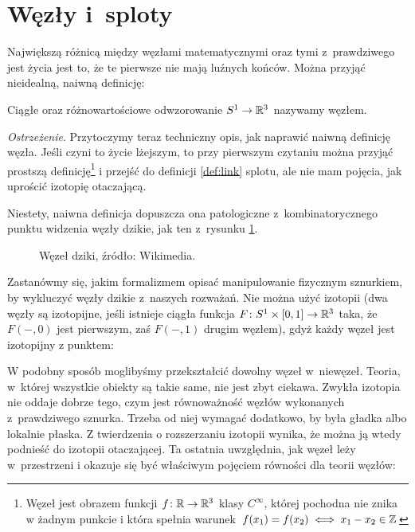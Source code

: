 
\section{Węzły i~sploty}
Największą różnicą między węzłami matematycznymi oraz tymi z~prawdziwego jest życia jest to, że te pierwsze nie mają luźnych końców.
Można przyjąć nieidealną, naiwną definicję:

\begin{definition}
    Ciągłe oraz różnowartościowe odwzorowanie $S^1 \to \mathbb R^3$ nazywamy węzłem.
\end{definition}

\emph{Ostrzeżenie}.
Przytoczymy teraz techniczny opis, jak naprawić naiwną definicję węzła. 
Jeśli czyni to życie lżejszym, to przy pierwszym czytaniu można przyjąć prostszą definicję\footnote{Węzeł jest obrazem funkcji $f \colon \mathbb R \to \mathbb R^3$ klasy $C^\infty$, której pochodna nie znika w żadnym punkcie i która spełnia warunek $f(x_1) = f(x_2) \iff x_1 - x_2 \in \mathbb Z$} i przejść do definicji \ref{def:link} splotu, ale nie mam pojęcia, jak uprościć izotopię otaczającą.

Niestety, naiwna definicja dopuszcza ona patologiczne z~kombinatorycznego punktu widzenia węzły dzikie, jak ten z~rysunku \ref{fig_wild_knot}.

\begin{figure}[H]
    \centering

    \caption[caption-for-lof-1]{Węzeł dziki, źródło: Wikimedia{\footnotemark}.}
    \label{fig_wild_knot}
\end{figure}

Zastanówmy się, jakim formalizmem opisać manipulowanie fizycznym sznurkiem, by wykluczyć węzły dzikie z~naszych rozważań.
Nie można użyć izotopii (dwa węzły są izotopijne, jeśli istnieje ciągła funkcja $F \colon S^1 \times [0, 1] \to \mathbb R^3$ taka, że $F(-, 0)$ jest pierwszym, zaś $F(-,1)$ drugim węzłem), gdyż każdy węzeł jest izotopijny z punktem:


W podobny sposób moglibyśmy przekształcić dowolny węzeł w~niewęzeł.
Teoria, w~której wszystkie obiekty są takie same, nie jest zbyt ciekawa.
Zwykła izotopia nie oddaje dobrze tego, czym jest równoważność węzłów wykonanych z~prawdziwego sznurka.
Trzeba od niej wymagać dodatkowo, by była gładka albo lokalnie płaska.
Z twierdzenia o rozszerzaniu izotopii wynika, że można ją wtedy podnieść do izotopii otaczającej.
Ta ostatnia uwzględnia, jak węzeł leży w~przestrzeni i okazuje się być właściwym pojęciem równości dla teorii węzłów:

